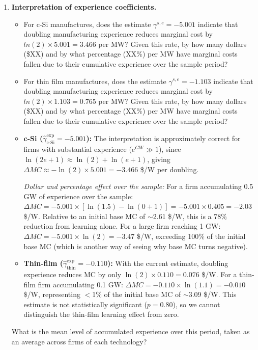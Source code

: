\documentclass[12pt]{article}
\begin{document}
\begin{enumerate}
    \item \textbf{Interpretation of experience coefficients.} 
    \begin{itemize}
        \item For c-Si manufactures, does the estimate $\gamma^{s,e} = -5.001$ indicate that doubling manufacturing experience reduces marginal cost by $ln(2)\times 5.001 = 3.466$ per MW? Given this rate, by how many dollars (\$XX) and by what percentage (XX\%) per MW have marginal costs fallen due to their cumulative experience over the sample period? 
        \item For thin film manufactures, does the estimate $\gamma^{s,e} = -1.103$ indicate that doubling manufacturing experience reduces marginal cost by $ln(2)\times 1.103 = 0.765$ per MW? Given this rate, by how many dollars (\$XX) and by what percentage (XX\%) per MW have marginal costs fallen due to their cumulative experience over the sample period?
    \end{itemize}

    {\color{answerblue}
    \begin{itemize}[leftmargin=2em]
        \item \textbf{c-Si ($\hat{\gamma}^{\text{exp}}_{\text{c-Si}} = -5.001$):} 
        The interpretation is approximately correct for firms with substantial experience ($e^{GW} \gg 1$), since $\ln(2e+1) \approx \ln(2) + \ln(e+1)$, giving $\Delta MC \approx -\ln(2) \times 5.001 = -3.466$ \$/W per doubling.

        \textit{Dollar and percentage effect over the sample:} For a firm accumulating 0.5 GW of experience over the sample: $\Delta MC = -5.001 \times [\ln(1.5) - \ln(0+1)] = -5.001 \times 0.405 = -2.03$ \$/W. Relative to an initial base MC of $\sim$2.61 \$/W, this is a 78\% reduction from learning alone. For a large firm reaching 1 GW: $\Delta MC = -5.001 \times \ln(2) = -3.47$ \$/W, exceeding 100\% of the initial base MC (which is another way of seeing why base MC turns negative).

        \item \textbf{Thin-film ($\hat{\gamma}^{\text{exp}}_{\text{thin}} = -0.110$):}
        With the current estimate, doubling experience reduces MC by only $\ln(2) \times 0.110 = 0.076$ \$/W. For a thin-film firm accumulating 0.1 GW: $\Delta MC = -0.110 \times \ln(1.1) = -0.010$ \$/W, representing $<$1\% of the initial base MC of $\sim$3.09 \$/W. This estimate is not statistically significant ($p = 0.80$), so we cannot distinguish the thin-film learning effect from zero.
        \end{itemize}
    }
    {\color{red} What is the mean level of accumulated experience over this period, taken as an average across firms of each technology?
    }


\end{enumerate}
\end{document}
